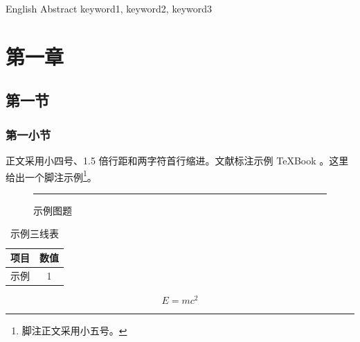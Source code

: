 \documentclass[type=doctor]{hustthesis} %
\begin{document}
\maketitle %

\frontmatter

\begin{abstract}
  中文摘要
  \keywords 关键词1；关键词2；关键词3
\end{abstract}

\begin{abstract*}
  English Abstract
  \keywords* keyword1, keyword2, keyword3
\end{abstract*}

\tableofcontents

\mainmatter

\chapter{第一章}

\section{第一节}

\subsection{第一小节}

正文采用小四号、1.5 倍行距和两字符首行缩进。文献标注示例
\TeX{}Book \cite{knuth1986TeXbook}。这里给出一个脚注示例\footnote{脚注正文采用小五号。}。

\begin{figure}[htbp]
  \centering
  \rule{6cm}{2cm}
  \caption{示例图题}
\end{figure}

\begin{table}[htbp]
  \centering
  \caption{示例三线表}
  \begin{tabular}{cc}
    \toprule
    项目 & 数值 \\
    \midrule
    示例 & 1 \\
    \bottomrule
  \end{tabular}
\end{table}

\begin{equation}
  E = mc^2
\end{equation}
\end{document}

